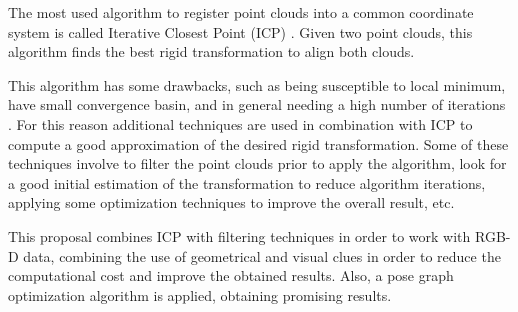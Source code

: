 
The most used algorithm to register point clouds into a common coordinate 
system is called Iterative Closest Point (ICP) \cite{mckay92}. Given two point clouds, 
this algorithm finds the best rigid transformation to align both clouds. 

This algorithm has some drawbacks, such as being susceptible to local minimum, 
have small convergence basin, and in general needing a high number of iterations \cite{Rusu2009}. 
For this reason additional techniques are used in combination with ICP to compute a good approximation 
of the desired rigid transformation. Some of these techniques involve to filter the point clouds prior 
to apply the algorithm, look for a good initial estimation of the transformation to reduce algorithm 
iterations, applying some optimization techniques to improve the overall result, etc. 


This proposal combines ICP with filtering techniques in order to work with RGB-D data, combining the use of geometrical 
and visual clues in order to reduce the computational cost and improve the obtained results. Also, a pose graph optimization 
algorithm is applied, obtaining promising results.
